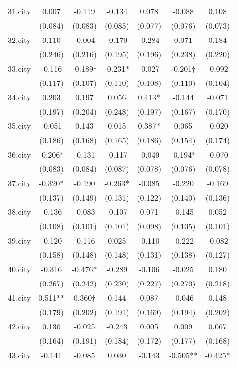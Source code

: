 \documentclass[]{article}
\begin{document}
\begin{tabular}{lcccccc}
31.city & 0.007 & -0.119 & -0.134 & 0.078 & -0.088 & 0.108 \\
 & (0.084) & (0.083) & (0.085) & (0.077) & (0.076) & (0.073) \\
32.city & 0.110 & -0.004 & -0.179 & -0.284 & 0.071 & 0.184 \\
 & (0.246) & (0.216) & (0.195) & (0.196) & (0.238) & (0.220) \\
33.city & -0.116 & -0.189† & -0.231* & -0.027 & -0.201† & -0.092 \\
 & (0.117) & (0.107) & (0.110) & (0.108) & (0.110) & (0.104) \\
34.city & 0.203 & 0.197 & 0.056 & 0.413* & -0.144 & -0.071 \\
 & (0.197) & (0.204) & (0.248) & (0.197) & (0.167) & (0.170) \\
35.city & -0.051 & 0.143 & 0.015 & 0.387* & 0.065 & -0.020 \\
 & (0.186) & (0.168) & (0.165) & (0.186) & (0.154) & (0.174) \\
36.city & -0.206* & -0.131 & -0.117 & -0.049 & -0.194* & -0.070 \\
 & (0.083) & (0.084) & (0.087) & (0.078) & (0.076) & (0.078) \\
37.city & -0.320* & -0.190 & -0.263* & -0.085 & -0.220 & -0.169 \\
 & (0.137) & (0.149) & (0.131) & (0.122) & (0.140) & (0.136) \\
38.city & -0.136 & -0.083 & -0.107 & 0.071 & -0.145 & 0.052 \\
 & (0.108) & (0.101) & (0.101) & (0.098) & (0.105) & (0.101) \\
39.city & -0.120 & -0.116 & 0.025 & -0.110 & -0.222 & -0.082 \\
 & (0.158) & (0.148) & (0.148) & (0.131) & (0.138) & (0.127) \\
40.city & -0.316 & -0.476* & -0.289 & -0.106 & -0.025 & 0.180 \\
 & (0.267) & (0.242) & (0.230) & (0.227) & (0.270) & (0.218) \\
41.city & 0.511** & 0.360† & 0.144 & 0.087 & -0.046 & 0.148 \\
 & (0.179) & (0.202) & (0.191) & (0.169) & (0.194) & (0.202) \\
42.city & 0.130 & -0.025 & -0.243 & 0.005 & 0.009 & 0.067 \\
 & (0.164) & (0.191) & (0.184) & (0.172) & (0.177) & (0.168) \\
43.city & -0.141 & -0.085 & 0.030 & -0.143 & -0.505** & -0.425* \\

\end{tabular}
\end{document}
